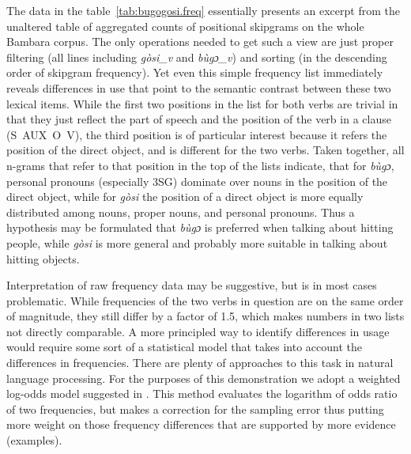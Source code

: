 \documentclass[12pt]{article}
\begin{document}
The data in the table~\ref{tab:bugogosi.freq} essentially presents an
excerpt from the unaltered table of aggregated counts of positional
skipgrams on the whole Bambara corpus. The only operations needed to
get such a view are just proper filtering (all lines including
\textit{gòsi\_v} and \textit{bùgɔ\_v}) and sorting (in the descending
order of skipgram frequency). Yet even this simple frequency list
immediately reveals differences in use that point to the semantic
contrast between these two lexical items. While the first two
positions in the list for both verbs are trivial in that they just
reflect the part of speech and the position of the verb in a clause
(\mbox{S AUX O V}), the third position is of particular interest
because it refers the position of the direct object, and is different
for the two verbs. Taken together, all n-grams that refer to that
position in the top of the lists indicate, that for \textit{bùgɔ},
personal pronouns (especially 3SG) dominate over nouns in the position
of the direct object, while for \textit{gòsi} the position of a direct
object is more equally distributed among nouns, proper nouns, and
personal pronouns. Thus a hypothesis may be formulated that
\textit{bùgɔ} is preferred when talking about hitting people, while
\textit{gòsi} is more general and probably more suitable in talking
about hitting objects.

Interpretation of raw frequency data may be suggestive, but is in most
cases problematic. While frequencies of the two verbs in question are
on the same order of magnitude, they still differ by a factor of 1.5,
which makes numbers in two lists not directly comparable. A more
principled way to identify differences in usage would require some
sort of a statistical model that takes into account the differences in
frequencies. There are plenty of approaches to this task in natural
language processing. For the purposes of this demonstration we adopt a
weighted log-odds model suggested in \textcite{monroe2008}. This method
evaluates the logarithm of odds ratio of two frequencies, but makes a
correction for the sampling error thus putting more weight on those
frequency differences that are supported by more evidence
(examples). 
\end{document}
